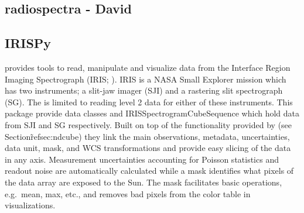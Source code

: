 \subsection{radiospectra - David}



\subsection{IRISPy}
\label{sec:irispy}

 provides tools to read, manipulate and visualize data from the Interface Region Imaging Spectrograph (IRIS; \citealt{DePontieu2014}).
IRIS is a NASA Small Explorer mission which has two instruments; a slit-jaw imager (SJI) and a rastering slit spectrograph (SG).
The  is limited to reading level 2 data for either of these instruments.
This package provide data classes  and {IRISSpectrogramCubeSequence} which hold data from SJI and SG respectively.
Built on top of the functionality provided by  (see Section\~ref{sec:ndcube}) they link the main observations, metadata, uncertainties, data unit, mask, and WCS transformations and provide easy slicing of the data in any axis.
Measurement uncertainties accounting for Poisson statistics and readout noise are automatically calculated while a mask identifies what pixels of the data array are exposed to the Sun.
The mask facilitates basic operations, e.g.\ mean, max, etc., and removes bad pixels from the color table in visualizations.
